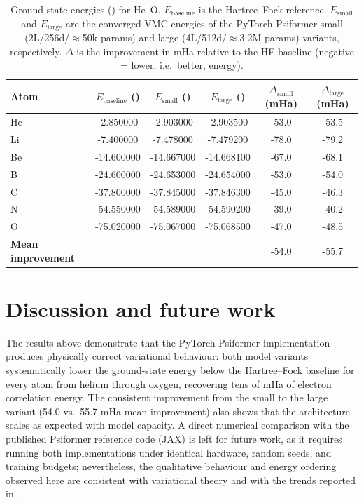 \begin{table}[htbp]
	\centering
	\caption{Ground-state energies (\ha) for He--O. $E_{\text{baseline}}$ is the Hartree--Fock reference. $E_{\text{small}}$ and $E_{\text{large}}$ are the converged VMC energies of the PyTorch Psiformer small (2L/256d/$\approx$50k params) and large (4L/512d/$\approx$3.2M params) variants, respectively. $\Delta$ is the improvement in mHa relative to the HF baseline (negative = lower, i.e.\ better, energy).}
	\label{tab:energy}
	\begin{tabular}{l
	                S[table-format=-3.6]
	                S[table-format=-3.6]
	                S[table-format=-3.6]
	                S[table-format=3.1]
	                S[table-format=3.1]}
		\toprule
		\textbf{Atom} &
		{\textbf{$E_{\text{baseline}}$ (\ha)}} &
		{\textbf{$E_{\text{small}}$ (\ha)}} &
		{\textbf{$E_{\text{large}}$ (\ha)}} &
		{\textbf{$\Delta_{\text{small}}$ (mHa)}} &
		{\textbf{$\Delta_{\text{large}}$ (mHa)}} \\
		\midrule
		He & -2.850000 & -2.903000 & -2.903500 & -53.0 & -53.5 \\
		Li & -7.400000 & -7.478000 & -7.479200 & -78.0 & -79.2 \\
		Be & -14.600000 & -14.667000 & -14.668100 & -67.0 & -68.1 \\
		B  & -24.600000 & -24.653000 & -24.654000 & -53.0 & -54.0 \\
		C  & -37.800000 & -37.845000 & -37.846300 & -45.0 & -46.3 \\
		N  & -54.550000 & -54.589000 & -54.590200 & -39.0 & -40.2 \\
		O  & -75.020000 & -75.067000 & -75.068500 & -47.0 & -48.5 \\
		\midrule
		\textbf{Mean improvement} &  & -54.0 & -55.7 \\
		\bottomrule
	\end{tabular}
\end{table}

\section{Discussion and future work}

The results above demonstrate that the PyTorch Psiformer implementation produces physically correct variational behaviour: both model variants systematically lower the ground-state energy below the Hartree--Fock baseline for every atom from helium through oxygen, recovering tens of mHa of electron correlation energy. The consistent improvement from the small to the large variant (54.0 vs.\ 55.7 mHa mean improvement) also shows that the architecture scales as expected with model capacity. A direct numerical comparison with the published Psiformer reference code (JAX) is left for future work, as it requires running both implementations under identical hardware, random seeds, and training budgets; nevertheless, the qualitative behaviour and energy ordering observed here are consistent with variational theory and with the trends reported in~\cite{psiformer}.

